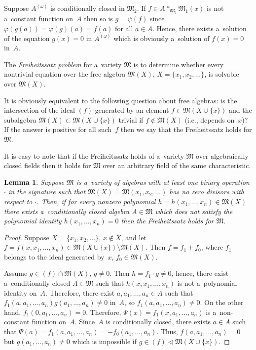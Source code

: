 \documentclass[11pt]{article}
\newtheorem{lemma}{Lemma}
\begin{document}
Suppose $A^{(\omega)}$ is conditionally closed in $\mathfrak M_2$.
If $f \in A*_{\mathfrak M_1} \mathfrak M_1(x)$ is not a~constant function on~$A$ then so is $g =\psi(f)$ since
$\varphi(g(a)) = \varphi(g)(a) = f(a)$ for all $a\in A$.
Hence, there exists a~solution of the equation $g(x)=0$ in $A^{(\omega)}$ which is obviously a~solution of $f(x)=0$
in~$A$.

The {\em Freiheitssatz problem} for a~variety $\mathfrak M$ is to determine whether every nontrivial equation over the
free algebra $\mathfrak M(X)$, $X=\{x_1,x_2,\dots \}$, is solvable over $\mathfrak M(X)$.

It is obviously equivalent to the following question about free algebras: is the intersection of the ideal $(f)$
generated by an element $f\in \mathfrak M(X\cup \{x\})$ and the subalgebra $\mathfrak M(X)\subset \mathfrak M(X\cup
\{x\})$ trivial if $f \notin \mathfrak M(X)$ (i.e., depends on~$x$)? If the answer is positive for all such~$f$ then we
say that the Freiheitssatz holds for $\mathfrak M$.

It is easy to note that if the Freiheitssatz holds of a~variety $\mathfrak M$ over algebraically closed f\/ields then it
holds for $\mathfrak M$ over an arbitrary f\/ield of the same characteristic.

\begin{lemma}
\label{lem:CC-Frei}
Suppose $\mathfrak M$ is a~variety of algebras with at least one binary operation $\cdot $ in the signature such that
$\mathfrak M(X)=\mathfrak M(x_1,x_2,\dots)$ has no zero divisors with respect to $\cdot $.
Then, if for every nonzero polynomial $h=h(x_1,\dots, x_n)\in \mathfrak M(X)$ there exists a~conditionally closed
algebra $A\in \mathfrak M$ which does not satisfy the polynomial identity $h(x_1,\dots, x_n) = 0$ then the Freiheitssatz
holds for $\mathfrak M$.
\end{lemma}

\begin{proof}
Suppose $X=\{x_1,x_2,\dots \}$, $x\notin X$, and let $f=f(x, x_1,\dots, x_n)\in \mathfrak M(X\cup\{x\})\setminus{\mathfrak M}(X)$.
Then $f=f_1 + f_0$, where $f_1$ belongs to the ideal generated by~$x$, $f_0\in {\mathfrak M}(X)$.

Assume $g\in (f)\cap {\mathfrak M}(X)$, $g\ne 0$.
Then $h=f_1 \cdot g \ne 0$, hence, there exist a~conditionally closed $A\in \mathfrak M$ such that $h(x,x_1,\dots, x_n)$
is not a~polynomial identity on~$A$.
Therefore, there exist $a,a_1,\dots, a_n\in A$ such that $f_1(a, a_1,\dots, a_n) g(a_1,\dots, a_n)\ne 0 $ in~$A$, so
\mbox{$f_1(a, a_1,\dots, a_n)\ne 0$}.
On the other hand, $f_1(0,a_1,\dots, a_n)=0$.
Therefore, $\Psi(x) = f_1(x, a_1,\dots, a_n)$ is a~non-constant function on~$A$.
Since~$A$ is conditionally closed, there exists $a\in A$ such that $\Psi(a) = f_1(a, a_1,\dots, a_n) = -f_0(a_1,\dots,
a_n)$.
Thus, $f(a,a_1,\dots, a_n)=0$ but $g(a_1,\dots, a_n)\ne 0$ which is impossible if $g\in (f)\triangleleft \mathfrak
M(X\cup\{x\})$.
\end{proof}
\end{document}
